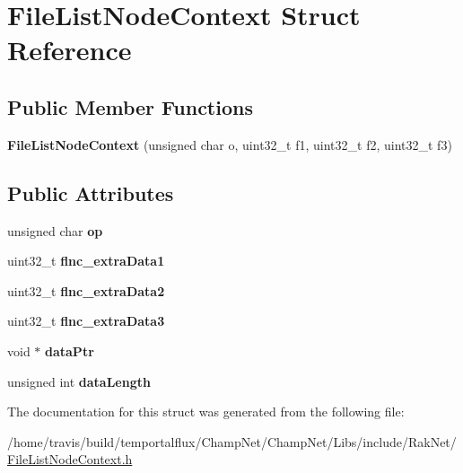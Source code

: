 \hypertarget{struct_file_list_node_context}{\section{File\-List\-Node\-Context Struct Reference}
\label{struct_file_list_node_context}
}
\subsection*{Public Member Functions}
\begin{DoxyCompactItemize}
\item 
\hypertarget{struct_file_list_node_context_ad0f08216d971d6b08d072913b5087501}{{\bfseries File\-List\-Node\-Context} (unsigned char o, uint32\-\_\-t f1, uint32\-\_\-t f2, uint32\-\_\-t f3)}\label{struct_file_list_node_context_ad0f08216d971d6b08d072913b5087501}

\end{DoxyCompactItemize}
\subsection*{Public Attributes}
\begin{DoxyCompactItemize}
\item 
\hypertarget{struct_file_list_node_context_a380f8bb5c81f31092e629ed4a12c4b70}{unsigned char {\bfseries op}}\label{struct_file_list_node_context_a380f8bb5c81f31092e629ed4a12c4b70}

\item 
\hypertarget{struct_file_list_node_context_a01936c842914204392a8dca3e488adf2}{uint32\-\_\-t {\bfseries flnc\-\_\-extra\-Data1}}\label{struct_file_list_node_context_a01936c842914204392a8dca3e488adf2}

\item 
\hypertarget{struct_file_list_node_context_a4286a4065fbf45af8d2645e729f1c038}{uint32\-\_\-t {\bfseries flnc\-\_\-extra\-Data2}}\label{struct_file_list_node_context_a4286a4065fbf45af8d2645e729f1c038}

\item 
\hypertarget{struct_file_list_node_context_a98fa3cd49902544bf6db4d2dda5c8902}{uint32\-\_\-t {\bfseries flnc\-\_\-extra\-Data3}}\label{struct_file_list_node_context_a98fa3cd49902544bf6db4d2dda5c8902}

\item 
\hypertarget{struct_file_list_node_context_a54e8a4a84d5e8489619dae7687f7cced}{void $\ast$ {\bfseries data\-Ptr}}\label{struct_file_list_node_context_a54e8a4a84d5e8489619dae7687f7cced}

\item 
\hypertarget{struct_file_list_node_context_a0815770b385f61f4e6881410117f9061}{unsigned int {\bfseries data\-Length}}\label{struct_file_list_node_context_a0815770b385f61f4e6881410117f9061}

\end{DoxyCompactItemize}


The documentation for this struct was generated from the following file\-:\begin{DoxyCompactItemize}
\item 
/home/travis/build/temportalflux/\-Champ\-Net/\-Champ\-Net/\-Libs/include/\-Rak\-Net/\hyperlink{_file_list_node_context_8h}{File\-List\-Node\-Context.\-h}\end{DoxyCompactItemize}
